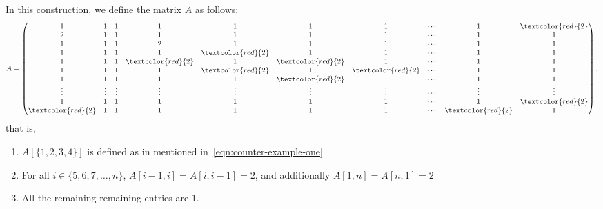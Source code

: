 \documentclass[11pt,letterpaper]{article}
\begin{document}
{{{{In this construction, we define the matrix $A$ as follows:
\[
A=
\begin{pmatrix}
1       &  1      & 1       & 1       & 1       & 1      & 1      & \cdots & 1      & \textcolor{red}{2}\\
2      &  1      & 1       & 1       & 1       & 1      & 1      & \cdots  & 1      & 1\\
1       &  1      & 1       & 2     & 1       & 1      & 1      & \cdots  & 1      & 1\\
1       &  1      & 1       & 1       & \textcolor{red}{2}       & 1      & 1      & \cdots  & 1      & 1\\
1       &  1      &  1      & \textcolor{red}{2}      & 1       & \textcolor{red}{2}      & 1      & \cdots  & 1      & 1\\
1       &  1      &  1      & 1       & \textcolor{red}{2}      & 1      & \textcolor{red}{2}     & \cdots  & 1      & 1\\
1       &  1      &  1      & 1       & 1       & \textcolor{red}{2}     & 1      & \cdots  & 1      & 1\\
\vdots  &  \vdots & \vdots  & \vdots  &\vdots   &\vdots  & \vdots & \cdots  & \vdots & \vdots\\
1     &  1      & 1       & 1       & 1       & 1      & 1      & \cdots  & 1      & \textcolor{red}{2}\\
\textcolor{red}{2}       &  1      & 1       & 1       & 1       & 1      & 1      & \cdots  & \textcolor{red}{2}     & 1\\
\end{pmatrix},
\]
that is,
\begin{enumerate}
\item $A[\{1,2,3,4\}]$ is defined as in mentioned in~\cref{eqn:counter-example-one}
\item For all $i\in\{5,6,7,\ldots, n\}$, $A[i-1, i]=A[i, i-1]=2$, and additionally  $A[1,n]=A[n,1]=2$
\item All the remaining remaining entries are 1.
\end{enumerate}
 
}}}}
\end{document}

